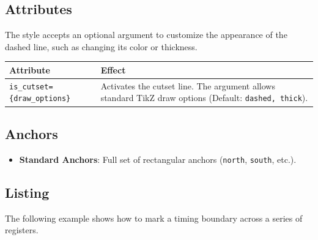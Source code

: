     \subsection{\sffamily Attributes}
        The style accepts an optional argument to customize the appearance of the dashed line, such as changing its color or thickness.

    \begin{center}
        \begin{tabular}{lp{8cm}}
        \toprule
            \textbf{Attribute} & \textbf{Effect} \\
            \midrule
            \texttt{is\_cutset=\{draw\_options\}} & Activates the cutset line. The argument allows standard TikZ draw options (Default: \texttt{dashed, thick}). \\
            \bottomrule
        \end{tabular}
    \end{center}

    \subsection{\sffamily Anchors}
            \begin{itemize}
                \item \textbf{Standard Anchors}: Full set of rectangular anchors (\texttt{north}, \texttt{south}, etc.).
            \end{itemize}

    \subsection{\sffamily Listing}
        The following example shows how to mark a timing boundary across a series of registers.

\begin{RTLexample}
\end{RTLexample}
